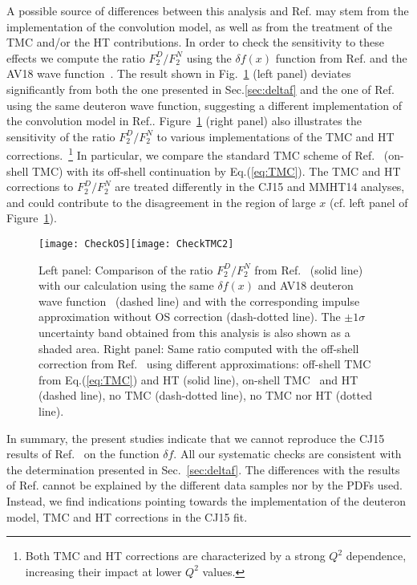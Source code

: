 \documentclass[%
      aps,
      prd,
      floatfix,
      preprintnumbers,
      preprint,
      showpacs,
      nofootinbib,
      tightenlines,
      amssymb,
      amsmath
]{revtex4-1}
\newcommand{\eq}[1]{Eq.(\ref{#1})}
\begin{document}
A possible source of differences between this analysis and Ref.\cite{Accardi:2016qay}
may stem from the implementation of the convolution model, as well as from the 
treatment of the TMC and/or the HT contributions.
In order to check the sensitivity to these effects we compute the ratio
$F_2^D/F_2^N$ using the $\delta f(x)$ function from Ref.\cite{Accardi:2016qay} and
the AV18 wave function~\cite{Veerasamy:2011ak}.
The result shown in Fig.~\ref{fig:CJ15-OS} (left panel) deviates significantly from 
both the one presented in Sec.\ref{sec:deltaf} and the one of Ref.~\cite{Accardi:2016qay} 
using the same deuteron wave function, 
suggesting a different implementation of the convolution model in Ref.\cite{Accardi:2016qay}. 
Figure~\ref{fig:CJ15-OS} (right panel) also illustrates the sensitivity of the ratio $F_2^D/F_2^N$ to 
various implementations of the TMC and HT corrections.~\footnote{Both TMC and HT corrections are 
characterized by a strong $Q^2$ dependence, increasing their impact at lower $Q^2$ values.} 
% 
In particular, we compare the standard TMC scheme of Ref.~\cite{Georgi:1976ve} (on-shell TMC) 
with its off-shell continuation by \eq{eq:TMC}. 
The TMC and HT corrections to $F_2^D/F_2^N$ are treated differently in the CJ15 and MMHT14 analyses, 
and could contribute to the disagreement in the region of large $x$ (cf. left panel of Figure~\ref{fig:CJ15-OS}).  


\begin{figure}[tb] %
\begin{center}
\texttt{[image: CheckOS]}\texttt{[image: CheckTMC2]}
\caption{%
Left panel: Comparison of the ratio $F_2^D/F_2^N$ from Ref.~\cite{Accardi:2016qay} (solid line) with 
our calculation using the same $\delta f(x)$ and AV18 deuteron wave function~\cite{Veerasamy:2011ak} 
(dashed line) and with the corresponding impulse approximation without OS correction (dash-dotted line).  
The $\pm 1\sigma$ uncertainty band obtained from this analysis is also shown as a shaded area. 
Right panel: Same ratio computed with the off-shell correction from Ref.~\cite{KP04} using  
different approximations: off-shell TMC from \eq{eq:TMC} and HT (solid line), 
on-shell TMC~\cite{Georgi:1976ve} and HT (dashed line), 
no TMC (dash-dotted line), no TMC nor HT (dotted line).  
}
\label{fig:CJ15-OS}
\end{center}
\end{figure}


In summary, the present studies indicate that we cannot reproduce the CJ15 results of 
Ref.~\cite{Accardi:2016qay} on the function $\delta f$. 
All our systematic checks are consistent with the determination presented in Sec.~\ref{sec:deltaf}.  
The differences with the results of Ref.\cite{Accardi:2016qay} 
cannot be explained by the different data samples nor by the PDFs used. 
Instead, we find indications pointing towards the implementation of the deuteron model, 
TMC and HT corrections in the CJ15 fit.  




%

\end{document}
